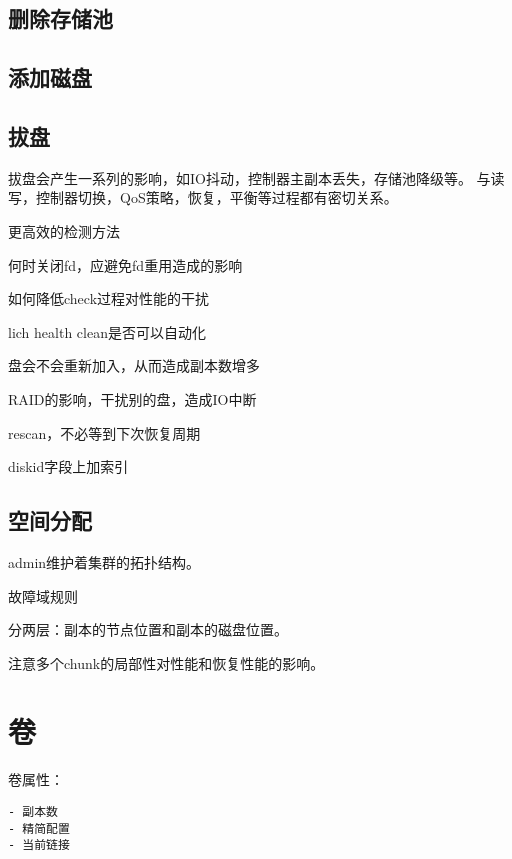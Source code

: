 \subsection{删除存储池}

\subsection{添加磁盘}


\subsection{拔盘}

拔盘会产生一系列的影响，如IO抖动，控制器主副本丢失，存储池降级等。
与读写，控制器切换，QoS策略，恢复，平衡等过程都有密切关系。

\begin{compactenum}
\item 更高效的检测方法
\item 何时关闭fd，应避免fd重用造成的影响
\item 如何降低check过程对性能的干扰
\item lich health clean是否可以自动化
\item 盘会不会重新加入，从而造成副本数增多
\item RAID的影响，干扰别的盘，造成IO中断
\item rescan，不必等到下次恢复周期
\end{compactenum}

diskid字段上加索引

\subsection{空间分配}

admin维护着集群的拓扑结构。

故障域规则

分两层：副本的节点位置和副本的磁盘位置。

注意多个chunk的局部性对性能和恢复性能的影响。

\section{卷}

卷属性：
\begin{lstlisting}
- 副本数
- 精简配置
- 当前链接
\end{lstlisting}


